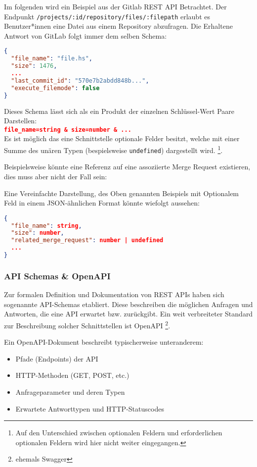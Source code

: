 Im folgenden wird ein Beispiel aus der Gitlab REST API Betrachtet. Der Endpunkt \texttt{/projects/:id/repository/files/:filepath} erlaubt es
Benutzer*innen eine Datei aus einem Repository abzufragen. Die Erhaltene Antwort von GitLab folgt immer dem selben Schema:
\begin{lstlisting}[language=json]
{
  "file_name": "file.hs",
  "size": 1476,
  ...
  "last_commit_id": "570e7b2abdd848b...",
  "execute_filemode": false
}
\end{lstlisting}

Dieses Schema lässt sich als ein Produkt der einzelnen Schlüssel-Wert Paare Darstellen: \\
\lstinline[language=json]|file_name=string & size=number & ...|\\

Es ist möglich das eine Schnittstelle optionale Felder besitzt, welche mit einer Summe 
des unären Typen (bespielsweise \texttt{undefined}) dargestellt wird.
\footnote{Auf den Unterschied zwischen optionalen Feldern und erforderlichen optionalen Feldern wird hier nicht weiter eingegangen.}.

Beispielsweise könnte eine Referenz auf eine assoziierte Merge Request existieren, dies muss aber nicht der Fall sein:

Eine Vereinfachte Darstellung, des Oben genannten Beispiels mit Optionalem Feld 
in einem JSON-ähnlichen Format könnte wiefolgt aussehen:

\begin{lstlisting}[language=json]
{
  "file_name": string,
  "size": number,
  "related_merge_request": number | undefined
  ...
}
\end{lstlisting}

\subsubsection{API Schemas \& OpenAPI}

Zur formalen Definition und Dokumentation\cite{10.1145/2577080.2577098} von REST APIs haben sich sogenannte API-Schemas etabliert.
Diese beschreiben die möglichen Anfragen und Antworten, die eine API erwartet bzw. zurückgibt.
Ein weit verbreiteter Standard zur Beschreibung solcher Schnittstellen ist OpenAPI \footnote{ehemals Swagger}.\cite{Ed-douibiHamza2018OATt}\cite{BognerJustus2023DRAd}

Ein OpenAPI-Dokument beschreibt typischerweise unteranderem:
\begin{itemize}
    \item Pfade (Endpoints) der API
    \item HTTP-Methoden (GET, POST, etc.)
    \item Anfrageparameter und deren Typen
    \item Erwartete Antworttypen und HTTP-Statuscodes
\end{itemize}

